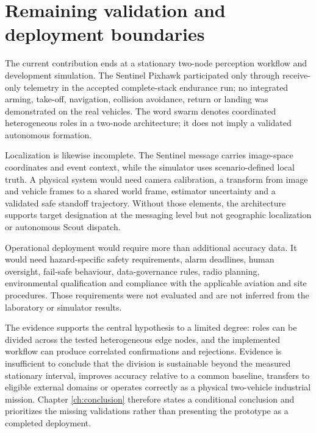 \section{Remaining validation and deployment boundaries}
\label{sec:discussion:6}

The current contribution ends at a stationary two-node perception workflow and
development simulation. The Sentinel Pixhawk participated only through
receive-only telemetry in the accepted complete-stack endurance run; no
integrated arming, take-off, navigation, collision
avoidance, return or landing was demonstrated on the real vehicles. The word
swarm denotes coordinated heterogeneous roles in a two-node architecture; it
does not imply a validated autonomous formation.

Localization is likewise incomplete. The Sentinel message carries image-space
coordinates and event context, while the simulator uses scenario-defined local
truth. A physical system would need camera calibration, a transform from image
and vehicle frames to a shared world frame, estimator uncertainty and a
validated safe standoff trajectory. Without those elements, the architecture
supports target designation at the messaging level but not geographic
localization or autonomous Scout dispatch.

Operational deployment would require more than additional accuracy data. It
would need hazard-specific safety requirements, alarm deadlines, human
oversight, fail-safe behaviour, data-governance rules, radio planning,
environmental qualification and compliance with the applicable aviation and
site procedures. Those requirements were not evaluated and are not inferred
from the laboratory or simulator results.

The evidence supports the central hypothesis to a limited degree: roles can be
divided across the tested heterogeneous edge nodes, and the implemented
workflow can produce correlated confirmations and rejections. Evidence is
insufficient to conclude that the division is sustainable beyond the measured
stationary interval, improves accuracy relative to a common baseline, transfers
to eligible external domains or operates correctly as a physical two-vehicle
industrial mission. Chapter
\ref{ch:conclusion} therefore states a conditional conclusion and prioritizes
the missing validations rather than presenting the prototype as a completed
deployment.

